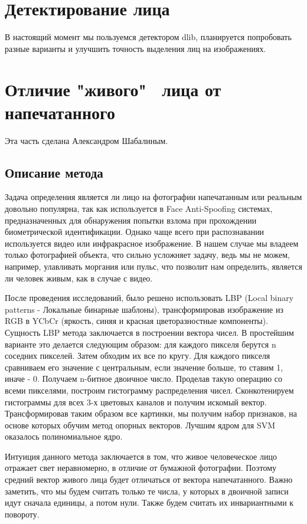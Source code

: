 \documentclass[a4paper,14pt]{extarticle}
\begin{document}
    \section{Детектирование лица}
    В настоящий момент мы пользуемся детектором dlib, планируется попробовать разные варианты и улучшить точность выделения лиц на изображениях.
    \newpage

    \section{Отличие "живого" \, лица от напечатанного}
    Эта часть сделана Александром Шабалиным.
    \subsection{Описание метода}
    \par Задача определения является ли лицо на фотографии напечатанным или реальным довольно популярна, так как используется в Face Anti-Spoofing системах, предназначенных для обнаружения попытки взлома при прохождении биометрической идентификации. Однако чаще всего при распознавании используется видео или инфракрасное изображение. В нашем случае мы владеем только фотографией объекта, что сильно усложняет задачу, ведь мы не можем, например, улавливать моргания или пульс, что позволит нам определить, является ли человек живым, как в случае с видео.
    \par После проведения исследований, было решено использовать LBP (Local binary patterns - Локальные бинарные шаблоны), трансформировав изображение из RGB в YCbCr (яркость, синяя и красная цветоразностные компоненты). Сущность LBP метода заключается в построении вектора чисел. В простейшим варианте это делается следующим образом: для каждого пикселя берутся n соседних пикселей. Затем обходим их все по кругу. Для каждого пикселя сравниваем его значение с центральным, если значение больше, то ставим 1, иначе - 0. Получаем n-битное двоичное число. Проделав такую операцию со всеми пикселями, построим гистограмму распределения чисел. Сконкотенируем гистограммы для всех 3-х цветовых каналов и получим искомый вектор. Трансформировав таким образом все картинки, мы получим набор признаков, на основе которых обучим метод опорных векторов. Лучшим ядром для SVM оказалось полиномиальное ядро.
    \par Интуиция данного метода заключается в том, что живое человеческое лицо отражает свет неравномерно, в отличие от бумажной фотографии. Поэтому средний вектор живого лица будет отличаться от вектора напечатанного. Важно заметить, что мы будем считать только те числа, у которых в двоичной записи идут сначала единицы, а потом нули. Также будем считать их инвариантными к повороту.
\end{document}
